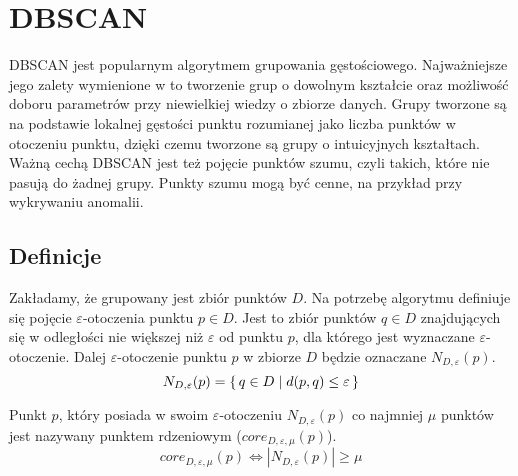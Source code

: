 \section{DBSCAN}
DBSCAN jest popularnym algorytmem grupowania gęstościowego. Najważniejsze jego zalety wymienione w \cite{dbscan} to tworzenie grup o dowolnym kształcie oraz możliwość doboru parametrów przy niewielkiej wiedzy o zbiorze danych. Grupy tworzone są na podstawie lokalnej gęstości punktu rozumianej jako liczba punktów w otoczeniu punktu, dzięki czemu tworzone są grupy o intuicyjnych kształtach. Ważną cechą DBSCAN jest też pojęcie punktów szumu, czyli takich, które nie pasują do żadnej grupy. Punkty szumu mogą być cenne, na przykład przy wykrywaniu anomalii.

\subsection{Definicje}

\newline
Zakładamy, że grupowany jest zbiór punktów $ D $. Na potrzebę algorytmu definiuje się pojęcie $ \varepsilon $-otoczenia punktu $ p \in D $. Jest to zbiór punktów $ q \in D $ znajdujących się w odległości nie większej niż $ \varepsilon $ od punktu $ p $, dla którego jest wyznaczane $\varepsilon$-otoczenie. Dalej $\varepsilon$-otoczenie punktu $ p $ w zbiorze $ D $ będzie oznaczane $ N_{D,\varepsilon}(p) $.
\begin{equation}\label{eq:eps-neighbourhood}
	N_{D,\varepsilon}(p) = \set{q \in D | d(p, q) \le \varepsilon}
\end{equation}

\newline
Punkt $ p $, który posiada w swoim $ \varepsilon $-otoczeniu $ N_{D,\varepsilon}(p) $ co najmniej $ \mu $ punktów jest nazywany punktem rdzeniowym ($ core_{D,\varepsilon,\mu}(p) $).
\begin{equation}\label{core-point}
	core_{D,\varepsilon,\mu}(p) \iff |N_{D,\varepsilon}(p)| \ge \mu
\end{equation}



